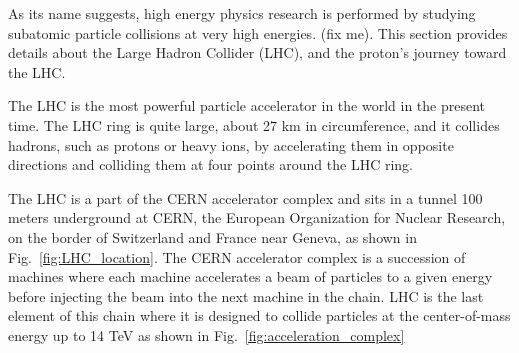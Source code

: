 
As its name suggests, high energy physics research is performed by studying subatomic particle collisions at very high energies. (fix me).
This section provides details about the Large Hadron Collider (LHC), and the proton's journey toward the LHC. %

The LHC is the most powerful particle accelerator in the world in the present time.
The LHC ring is quite large, about 27 km in circumference, and it collides hadrons, such as protons or heavy ions,
by accelerating them in opposite directions and colliding them at four points around the LHC ring.

The LHC is a part of the CERN accelerator complex and sits in a tunnel 100 meters underground at CERN, the European Organization for Nuclear Research, on the border of Switzerland and France near Geneva, as shown in Fig.~\ref{fig:LHC_location}. The CERN accelerator complex is a succession of machines where each machine accelerates a beam of particles to a given energy before injecting the beam into the next machine in the chain. LHC is the last element of this chain where it is designed to collide particles at the center-of-mass energy up to 14 TeV as shown in Fig.~\ref{fig:acceleration_complex}

